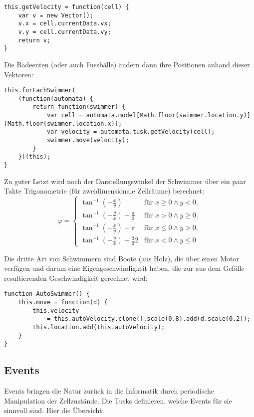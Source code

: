 \documentclass[11pt]{scrreprt} %
\theoremstyle{definition}
\begin{document}
\begin{lstlisting}
this.getVelocity = function(cell) {
	var v = new Vector();
	v.x = cell.currentData.vx;
	v.y = cell.currentData.vy;
	return v;
}
\end{lstlisting}

Die Badeenten (oder auch Fussbälle) ändern dann ihre Positionen anhand dieser Vektoren:
\begin{lstlisting}
this.forEachSwimmer(
	(function(automata) {
		return function(swimmer) {
			var cell = automata.model[Math.floor(swimmer.location.y)][Math.floor(swimmer.location.x)];
			var velocity = automata.tusk.getVelocity(cell);
			swimmer.move(velocity);
		}
	})(this);
}

\end{lstlisting}

Zu guter Letzt wird noch der Darstellungswinkel der Schwimmer über ein paar Takte Trigonometrie (für zweidimensionale Zellräume) berechnet:
\[
\varphi = \begin{cases}
\tan^{-1} \left(-\frac x y\right) & \textrm{für } x \ge 0 \land y < 0, \\
\tan^{-1} \left(-\frac y x\right)  + \frac \pi 2& \textrm{für } x > 0 \land y \ge 0, \\
\tan^{-1} \left(-\frac x y\right)  + \pi& \textrm{für } x \le 0 \land y > 0, \\
\tan^{-1} \left(-\frac y x\right)  + \frac 3\pi 2& \textrm{für } x < 0 \land y \le 0
\end{cases}
\]

Die dritte Art von Schwimmern sind Boote (aus Holz), die über einen Motor verfügen und darum eine Eigengeschwindigkeit haben, die zur aus dem Gefälle resultierenden Geschwindigkeit gerechnet wird:

\begin{lstlisting}
function AutoSwimmer() {
	this.move = function(d) {
		this.velocity
			= this.autoVelocity.clone().scale(0.8).add(d.scale(0.2));
		this.location.add(this.autoVelocity);
	}
}
\end{lstlisting}

\subsection{Events}

Events bringen die Natur zurück in die Informatik durch periodische Manipulation der Zellzustände. Die Tusks definieren, welche Events für sie sinnvoll sind. Hier die Übersicht:

\end{document}
